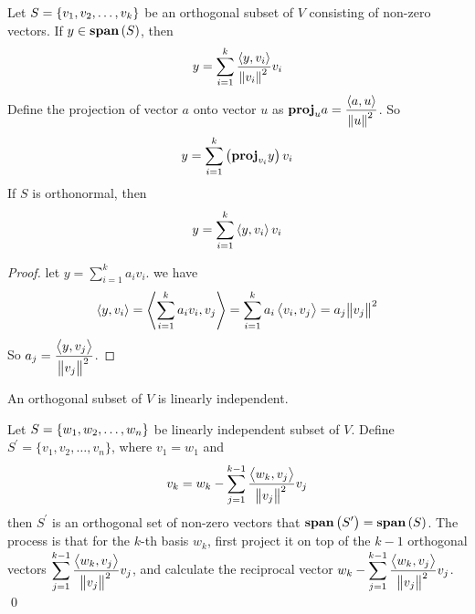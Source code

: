 \begin{theorem}
	Let $S=\set{ v_1, v_2, \dots, v_k }$ be an orthogonal subset of $V$ consisting of non-zero vectors. If $y \in \vectorspan{S}$, then
	\begin{equation}
		y = \sum_{i=1}^k \frac{\innerproduct{y}{v_i}}{\norm{v_i}^2} v_i
	\end{equation}
	Define the projection of vector $a$ onto vector $u$ as $\displaystyle \projection{a}{u} = \frac{\innerproduct{a}{u}}{\norm{u}^2}$. So 
	\begin{equation}
	    y = \sum_{i=1}^k \left(\projection{y}{v_i}\right) v_i
	\end{equation}
	If $S$ is orthonormal, then
	\begin{equation}
		y = \sum_{i=1}^k \innerproduct{y}{v_i} v_i
	\end{equation}
\end{theorem}
\begin{proof}
	let $\displaystyle y = \sum_{i=1}^k a_i v_i$. we have
	\begin{equation*}
		\innerproduct{y}{v_i} = \innerproduct{\sum_{i=1}^k a_i v_i}{v_j} = \sum_{i=1}^k a_i \innerproduct{v_i}{v_j} = a_j \norm{v_j}^2
	\end{equation*}
	So $\displaystyle a_j = \frac{\innerproduct{y}{v_j}}{\norm{v_j}^2}$.
	
	
\end{proof}

\begin{theorem}
	An orthogonal subset of $V$ is linearly independent.
\end{theorem}

\begin{definition}
	Let $S=\set{w_1, w_2, \dots, w_n }$ be linearly independent subset of $V$. Define $S^\prime=\{v_1,v_2,\dots,v_n  \}$, where $v_1=w_1$ and 
	\begin{equation}
		v_k = w_k - \sum_{j=1}^{k-1} \frac{\innerproduct{w_k}{v_j}}{\norm{v_j}^2} v_j
	\end{equation}
	then $S^\prime$ is an orthogonal set of non-zero vectors that $\vectorspan{S^\prime} = \vectorspan{S}$. The process is that for the $k$-th basis $w_k$, first project it on top of the $k-1$ orthogonal vectors $\displaystyle \sum_{j=1}^{k-1} \frac{\innerproduct{w_k}{v_j}}{\norm{v_j}^2} v_j$, and calculate the reciprocal vector $\displaystyle w_k - \sum_{j=1}^{k-1} \frac{\innerproduct{w_k}{v_j}}{\norm{v_j}^2} v_j$.
	\qed
\end{definition}

